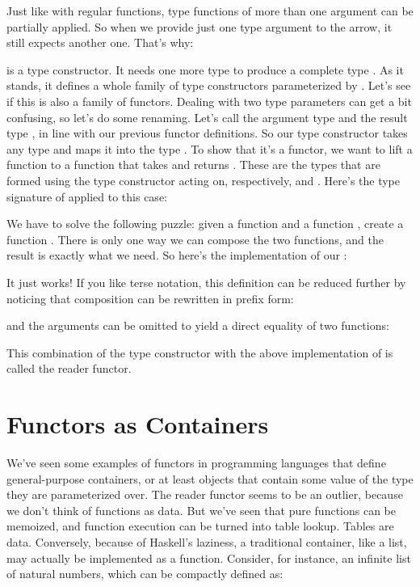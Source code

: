 Just like with regular functions, type functions of more than one
argument can be partially applied. So when we provide just one type
argument to the arrow, it still expects another one. That's why:

is a type constructor. It needs one more type  to produce a
complete type . As it stands, it defines a
whole family of type constructors parameterized by . Let's see
if this is also a family of functors. Dealing with two type parameters
can get a bit confusing, so let's do some renaming. Let's call the
argument type  and the result type , in line with
our previous functor definitions. So our type constructor takes any type
 and maps it into the type . To show
that it's a functor, we want to lift a function
 to a function that takes
 and returns . These
are the types that are formed using the type constructor
 acting on, respectively,  and
. Here's the type signature of  applied to this
case:

We have to solve the following puzzle: given a function
 and a function
, create a function
. There is only one way we can compose the two
functions, and the result is exactly what we need. So here's the
implementation of our :

It just works! If you like terse notation, this definition can be
reduced further by noticing that composition can be rewritten in prefix
form:

and the arguments can be omitted to yield a direct equality of two
functions:

This combination of the type constructor 
with the above implementation of  is called the reader
functor.

\section{Functors as Containers}

We've seen some examples of functors in programming languages that
define general-purpose containers, or at least objects that contain some
value of the type they are parameterized over. The reader functor seems
to be an outlier, because we don't think of functions as data. But we've
seen that pure functions can be memoized, and function execution can be
turned into table lookup. Tables are data. Conversely, because of
Haskell's laziness, a traditional container, like a list, may actually
be implemented as a function. Consider, for instance, an infinite list
of natural numbers, which can be compactly defined as:

